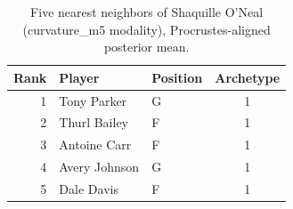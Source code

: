 \begin{table}[htbp]
  \centering\small
  \begin{tabular}{rllc}
    \toprule
    Rank & Player & Position & Archetype \\
    \midrule
    1 & Tony Parker & G & 1 \\
    2 & Thurl Bailey & F & 1 \\
    3 & Antoine Carr & F & 1 \\
    4 & Avery Johnson & G & 1 \\
    5 & Dale Davis & F & 1 \\
    \bottomrule
  \end{tabular}
  \caption{Five nearest neighbors of Shaquille O'Neal (curvature_m5 modality), Procrustes-aligned posterior mean.}
  \label{tab:Shaquille_O_Neal_neighbors_curvature_m5}
\end{table}

